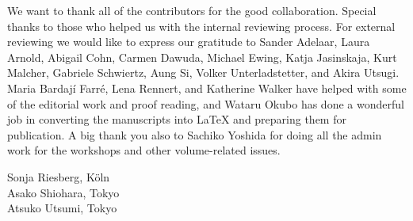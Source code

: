 We want to thank all of the contributors for the good collaboration. Special thanks to those who helped us with the internal reviewing process. For external reviewing we would like to express our gratitude to Sander Adelaar, Laura Arnold, Abigail Cohn, Carmen Dawuda, Michael Ewing, Katja Jasinskaja, Kurt Malcher, Gabriele Schwiertz, Aung Si, Volker Unterladstetter, and Akira Utsugi.
Maria Bardají Farré, Lena Rennert, and Katherine Walker have helped with some of the editorial work and proof reading, and Wataru Okubo has done a wonderful job in converting the manuscripts into LaTeX and preparing them for publication. A big thank you also to Sachiko Yoshida for doing all the admin work for the workshops and other volume-related issues.  

\begin{flushright}
Sonja Riesberg, Köln\\
Asako Shiohara, Tokyo\\
Atsuko Utsumi, Tokyo
\end{flushright}



